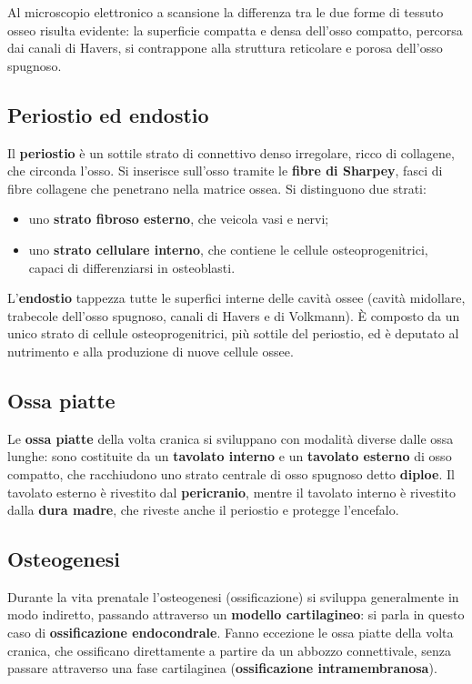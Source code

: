 Al microscopio elettronico a scansione la differenza tra le due forme di
tessuto osseo risulta evidente: la superficie compatta e densa dell'osso
compatto, percorsa dai canali di Havers, si contrappone alla struttura
reticolare e porosa dell'osso spugnoso.

\subsection{Periostio ed endostio}

Il \textbf{periostio} è un sottile strato di connettivo denso irregolare,
ricco di collagene, che circonda l'osso. Si inserisce sull'osso tramite le \textbf{fibre di
Sharpey}, fasci di fibre collagene che penetrano nella matrice ossea. Si
distinguono due strati:

\begin{itemize}
  \item uno \textbf{strato fibroso esterno}, che veicola vasi e nervi;
  \item uno \textbf{strato cellulare interno}, che contiene le cellule
    osteoprogenitrici, capaci di differenziarsi in osteoblasti.
\end{itemize}

L'\textbf{endostio} tappezza tutte le superfici interne delle cavità ossee
(cavità midollare, trabecole dell'osso spugnoso, canali di Havers e di
Volkmann). È composto da un unico strato di cellule osteoprogenitrici, più
sottile del periostio, ed è deputato al nutrimento e alla produzione di
nuove cellule ossee.

\subsection{Ossa piatte}

Le \textbf{ossa piatte} della volta cranica si sviluppano con modalità
diverse dalle ossa lunghe: sono costituite da un \textbf{tavolato interno} e
un \textbf{tavolato esterno} di osso compatto, che racchiudono uno strato
centrale di osso spugnoso detto \textbf{diploe}. Il tavolato esterno è
rivestito dal \textbf{pericranio}, mentre il tavolato interno è rivestito
dalla \textbf{dura madre}, che riveste anche il periostio e protegge
l'encefalo.

\subsection{Osteogenesi}

Durante la vita prenatale l'osteogenesi (ossificazione) si sviluppa
generalmente in modo indiretto, passando attraverso un \textbf{modello
cartilagineo}: si parla in questo caso di \textbf{ossificazione
endocondrale}. Fanno eccezione le ossa piatte della volta cranica, che
ossificano direttamente a partire da un abbozzo connettivale, senza passare
attraverso una fase cartilaginea (\textbf{ossificazione
intramembranosa}).

